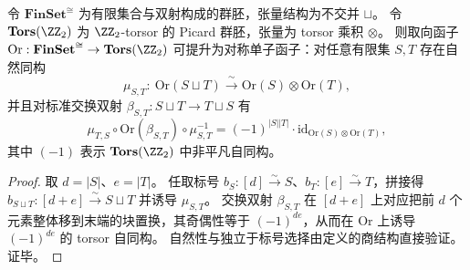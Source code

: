 \begin{proposition}\label{prop:bdry-orientation-functor-symmetric-monoidal-koszul}
令 \(\mathbf{FinSet}^{\cong}\) 为有限集合与双射构成的群胚，张量结构为不交并 \(\sqcup\)。
令 \(\mathbf{Tors}(\ZZ_2)\) 为 \(\ZZ_2\)-torsor 的 Picard 群胚，张量为 torsor 乘积 \(\otimes\)。
则取向函子 \(\mathrm{Or}:\mathbf{FinSet}^{\cong}\to \mathbf{Tors}(\ZZ_2)\) 可提升为对称单子函子：对任意有限集 \(S,T\) 存在自然同构
\[
\mu_{S,T}:\ \mathrm{Or}(S\sqcup T)\xrightarrow{\ \sim\ }\mathrm{Or}(S)\otimes\mathrm{Or}(T),
\]
并且对标准交换双射 \(\beta_{S,T}:S\sqcup T\to T\sqcup S\) 有
\[
\mu_{T,S}\circ \mathrm{Or}(\beta_{S,T})\circ \mu_{S,T}^{-1}
=(-1)^{|S||T|}\cdot\mathrm{id}_{\mathrm{Or}(S)\otimes \mathrm{Or}(T)},
\]
其中 \((-1)\) 表示 \(\mathbf{Tors}(\ZZ_2)\) 中非平凡自同构。
\end{proposition}
\begin{proof}
取 \(d=|S|\)、\(e=|T|\)。
任取标号 \(b_S:[d]\xrightarrow{\sim}S\)、\(b_T:[e]\xrightarrow{\sim}T\)，拼接得
\(
b_{S\sqcup T}:[d+e]\xrightarrow{\sim}S\sqcup T
\)
并诱导 \(\mu_{S,T}\)。
交换双射 \(\beta_{S,T}\) 在 \([d+e]\) 上对应把前 \(d\) 个元素整体移到末端的块置换，其奇偶性等于 \((-1)^{de}\)，从而在 \(\mathrm{Or}\) 上诱导 \((-1)^{de}\) 的 torsor 自同构。
自然性与独立于标号选择由定义的商结构直接验证。证毕。
\end{proof}

